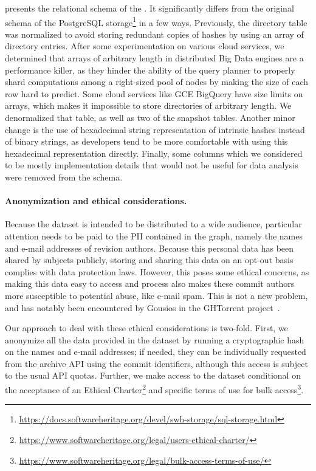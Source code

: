  presents the relational schema of the \SWHGD{}.
It significantly differs from the original schema of the PostgreSQL
storage\footnote{\url{https://docs.softwareheritage.org/devel/swh-storage/sql-storage.html}}
in a few ways. Previously, the directory table was normalized to avoid storing
redundant copies of hashes by using an array of directory entries. After some
experimentation on various cloud services, we determined that arrays of
arbitrary length in distributed Big Data engines are a performance killer, as
they hinder the ability of the query planner to properly shard computations
among a right-sized pool of nodes by making the size of each row hard to
predict. Some cloud services like GCE BigQuery have size limits on arrays,
which makes it impossible to store directories of arbitrary length. We
denormalized that table, as well as two of the snapshot tables. Another minor
change is the use of hexadecimal string representation of intrinsic hashes
instead of binary strings, as developers tend to be more comfortable with using
this hexadecimal representation directly. Finally, some columns which we
considered to be mostly implementation details that would not be useful for
data analysis were removed from the schema.

\paragraph*{Anonymization and ethical considerations.}
Because the dataset is intended to be distributed to a wide audience,
particular attention needs to be paid to the \gls{PII} contained in the graph,
namely the names and e-mail addresses of revision authors. Because this
personal data has been shared by subjects publicly, storing and sharing this
data on an opt-out basis complies with data protection laws. However, this
poses some ethical concerns, as making this data easy to access and process
also makes these commit authors more susceptible to potential abuse, like
e-mail spam. This is not a new problem, and has notably been encountered by
Gousios in the GHTorrent project~\cite{gousios2016issue32}.

Our approach to deal with these ethical considerations is two-fold. First, we
anonymize all the data provided in the dataset by running a cryptographic hash
on the names and e-mail addresses; if needed, they can be individually
requested from the archive API using the commit identifiers, although this
access is subject to the usual API quotas. Further, we make access to the
dataset conditional on the acceptance of an Ethical
Charter\footnote{\url{https://www.softwareheritage.org/legal/users-ethical-charter/}}
and specific terms of use for bulk
access\footnote{\url{https://www.softwareheritage.org/legal/bulk-access-terms-of-use/}}.


